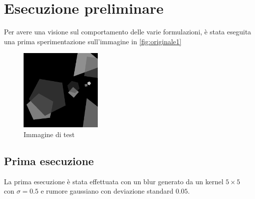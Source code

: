 \documentclass[11pt]{article}
\begin{document}
\newpage
\section{Esecuzione preliminare}
\label{chap:lambda}
Per avere una visione sul comportamento delle varie formulazioni, è stata eseguita una prima sperimentazione sull'immagine in \autoref{fig:originale1}
\begin{figure}[H]
    \centering
    \includegraphics[width=4cm]{esecuzione/originale.png}
    \caption{Immagine di test}
    \label{fig:originale1}
\end{figure}

\subsection{Prima esecuzione}
La prima esecuzione è stata effettuata con un blur generato da un kernel $5 \times 5$ con $\sigma=0.5$ e rumore gaussiano con deviazione standard $0.05$.
\end{document}
